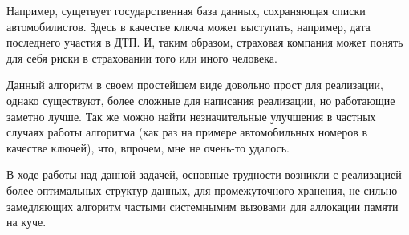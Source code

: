 \documentclass[12pt]{article}
\begin{document}
Например, сущетвует государственная база данных, сохраняющая списки автомобилистов. Здесь в качестве ключа может выступать, например, дата последнего участия в ДТП. И, таким образом, страховая компания может понять для себя риски в страховании того или иного человека.

Данный алгоритм в своем простейшем виде довольно прост для реализации, однако существуют, более сложные для написания реализации, но работающие заметно лучше. Так же можно найти незначительные улучшения в частных случаях работы алгоритма (как раз на примере автомобильных номеров в качестве ключей), что, впрочем, мне не очень-то удалось.

В ходе работы над данной задачей, основные трудности возникли с реализацией более оптимальных структур данных, для промежуточного хранения, не сильно замедляющих алгоритм частыми системнымим вызовами для аллокации памяти на куче.
\end{document}
